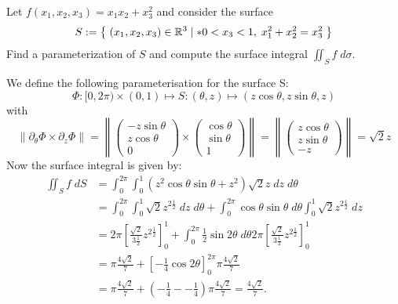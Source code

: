 \documentclass[11pt]{article}
\begin{document}
\begin{exercise}
    Let $f(x_1,x_2,x_3) = x_1 x_2 + x_3^2$ and consider the surface 
    \begin{gather*}
        S := \left\{ \; (x_1,x_2,x_3) \in \mathbb R^3 \suchthat* 0 < x_3 < 1, \; x_1^2 + x_2^2 = x_3^2 \;  \right\}
    \end{gather*}
    Find a parameterization of $S$ and compute the surface integral $\iint_S f \;d\sigma$. 
\end{exercise}
\begin{solution}
    We define the following parameterisation for the surface S:
    \[
    \Phi: [0,2\pi) \times (0,1) \mapsto S: (\theta,z)\mapsto (z\cos\theta, z\sin\theta,z)
    \]
    with
    \[
        \left\|\partial_{\theta}\Phi\times \partial_z\Phi\right\|  
        = 
        \left\|\begin{pmatrix} -z\sin\theta \\ z\cos\theta\\0 \end{pmatrix} \times \begin{pmatrix} \cos\theta \\ \sin\theta \\1 \end{pmatrix}\right\|
        = 
        \left\|\begin{pmatrix} z\cos\theta \\ z\sin\theta \\ -z \end{pmatrix}\right\| 
        = 
        \sqrt{2}z
    \]
    Now the surface integral is given by:
    \begin{align*}
        \iint_{S} f \;d S
        &
        = \int_0^{2\pi} \int_0^1 \left(z^2\cos\theta \sin\theta + z^2 \right)\sqrt{2}z\;d z \;d \theta
        \\&
        = \int_0^{2\pi} \int_0^1\sqrt{2}z^{2\frac{1}{2}} \;d z \;d \theta + \int_0^{2\pi} \cos\theta \sin\theta \;d \theta \int_0^1  \sqrt{2}z^{2\frac{1}{2}}\;d z 
        \\&
        =
        2\pi \left[\frac{\sqrt{2}}{3\frac{1}{2}} z^{2\frac{1}{2}}\right]_0^{1} + \int_0^{2\pi} \frac{1}{2}\sin2\theta \;d \theta 2\pi \left[\frac{\sqrt{2}}{3\frac{1}{2}} z^{2\frac{1}{2}}\right]_0^{1}
        \\&
        =
        \pi \frac{4\sqrt{2}}{7}+ \left[-\frac{1}{4}\cos2\theta\right]_{0}^{2\pi} \pi \frac{4\sqrt{2}}{7} 
        \\&
        = 
        \pi \frac{4\sqrt{2}}{7}+ \left(-\frac{1}{4} -  - \frac{1}{4}\right) \pi \frac{4\sqrt{2}}{7} 
        = 
        \frac{4\sqrt{2}}{7} 
        .
    \end{align*}
\end{solution}
\end{document}
